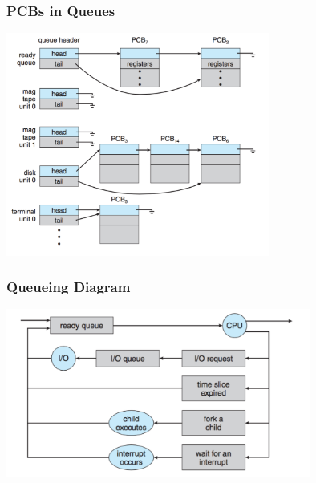 \begin{frame}
\frametitle{PCBs in Queues}

\begin{center}
\includegraphics[width=0.65\textwidth]{images/pcbs-in-queues.png}
\end{center}

\end{frame}



\begin{frame}
\frametitle{Queueing Diagram}

\begin{center}
\includegraphics[width=0.75\textwidth]{images/queueing-diagram.png}
\end{center}


\end{frame}



